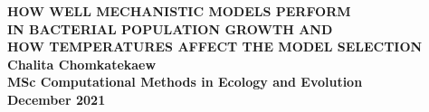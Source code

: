 \documentclass[12pt]{article}
\begin{document}
  \vspace{5.5cm}

  \begin{center}
    {\color{myblue}
    \textbf{ \large{HOW WELL MECHANISTIC MODELS PERFORM \\ IN BACTERIAL POPULATION GROWTH AND \\ HOW TEMPERATURES AFFECT THE MODEL SELECTION \\ }}}
    \vspace{15 cm}
    \textbf{\normalsize{Chalita Chomkatekaew \\ MSc Computational Methods in Ecology and Evolution \\ December 2021 \\ }}
    \vspace{0.5cm}
  \end{center}

  \vspace{4.5cm}

  \thispagestyle{empty}

  \newpage
  
  \setcounter{secnumdepth}{0}

  \bfseries
  \tableofcontents
  \normalfont

  \thispagestyle{empty}
  
\end{document}
